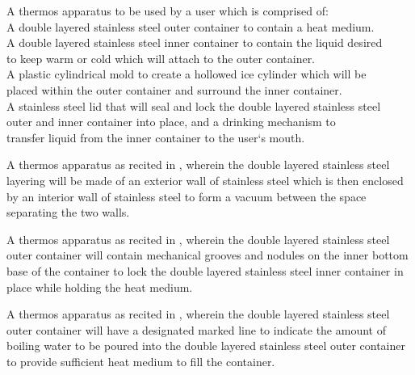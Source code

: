 \documentclass[english]{uspatent}
\begin{document}
\patentClaimsStart


A thermos apparatus to be used by a user which is comprised of:
\\ \hspace*{0.5cm} A double layered stainless steel outer container to contain a heat medium.
\\ \hspace*{0.5cm} A double layered stainless steel inner container to contain the liquid desired \\\hspace*{1.5cm}to keep warm or cold which will attach to the outer container.
\\ \hspace*{0.5cm} A plastic cylindrical mold to create a hollowed ice cylinder which will be \\\hspace*{1.5cm}placed within the outer container and surround the inner container.
\\ \hspace*{0.5cm} A stainless steel lid that will seal and lock the double layered stainless steel \\\hspace*{1.5cm}outer and inner container into place, and a drinking mechanism to \\\hspace*{1.5cm}transfer liquid from the inner container to the user`s mouth.


A thermos apparatus as recited in , wherein the double layered stainless steel layering will be made of an exterior wall of stainless steel which is then enclosed by an interior wall of stainless steel to form a vacuum between the space separating the two walls.


A thermos apparatus as recited in , wherein the double layered stainless steel outer container will contain mechanical grooves and nodules on the inner bottom base of the container to lock the double layered stainless steel inner container in place while holding the heat medium.


A thermos apparatus as recited in , wherein the double layered stainless steel outer container will have a designated marked line to indicate the amount of boiling water to be poured into the double layered stainless steel outer container to  provide sufficient heat medium to fill the container.
\end{document}

